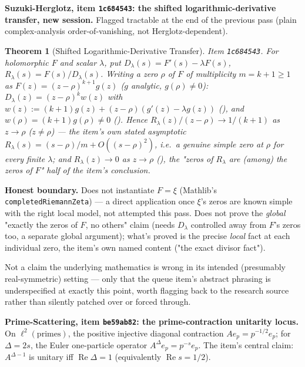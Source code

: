 \documentclass{report}
\newtheorem{theorem}{Theorem}[chapter]
\theoremstyle{definition}
\begin{document}
\textbf{Suzuki-Herglotz, item \texttt{1c684543}: the shifted logarithmic-derivative
transfer, new session.} Flagged tractable at the end of the previous pass (plain
complex-analysis order-of-vanishing, not Herglotz-dependent).

\begin{theorem}[Shifted Logarithmic-Derivative Transfer]
  \label{thm:shifted-log-deriv-transfer}
  \leanok
  Item \texttt{1c684543}. For holomorphic $F$ and scalar $\lambda$, put
  $D_\lambda(s)=F'(s)-\lambda F(s)$, $R_\lambda(s)=F(s)/D_\lambda(s)$. Writing a zero
  $\rho$ of $F$ of multiplicity $m=k+1\ge1$ as $F(z)=(z-\rho)^{k+1}g(z)$ ($g$ analytic,
  $g(\rho)\ne0$): $D_\lambda(z)=(z-\rho)^k w(z)$ with
  $w(z):=(k+1)g(z)+(z-\rho)(g'(z)-\lambda g(z))$
  (), and $w(\rho)=(k+1)g(\rho)\ne0$
  (). Hence
  $R_\lambda(z)/(z-\rho)\to1/(k+1)$ as $z\to\rho$ ($z\ne\rho$) --- the item's own stated
  asymptotic $R_\lambda(s)=(s-\rho)/m+O((s-\rho)^2)$, i.e.\ a genuine \emph{simple} zero at
  $\rho$ for every finite $\lambda$; and $R_\lambda(z)\to0$ as $z\to\rho$
  (), the "zeros of $R_\lambda$
  are (among) the zeros of $F$" half of the item's conclusion.
\end{theorem}

\textbf{Honest boundary.} Does not instantiate $F=\xi$ (Mathlib's
\texttt{completedRiemannZeta}) --- a direct application once $\xi$'s zeros are known
simple with the right local model, not attempted this pass. Does not prove the
\emph{global} "exactly the zeros of $F$, no others" claim (needs $D_\lambda$ controlled
away from $F$'s zeros too, a separate global argument); what's proved is the precise
\emph{local} fact at each individual zero, the item's own named content ("the exact
divisor fact").

Not a claim the underlying mathematics is wrong in its intended (presumably
real-symmetric) setting --- only that the queue item's abstract phrasing is
underspecified at exactly this point, worth flagging back to the research source rather
than silently patched over or forced through.

\textbf{Prime-Scattering, item \texttt{be59ab82}: the prime-contraction unitarity
locus.} On $\ell^2(\text{primes})$, the positive injective diagonal contraction
$Ae_p=p^{-1/2}e_p$; for $\Delta=2s$, the Euler one-particle operator $A^\Delta e_p=p^{-s}e_p$.
The item's central claim: $A^{\Delta-1}$ is unitary iff $\operatorname{Re}\Delta=1$
(equivalently $\operatorname{Re}s=1/2$).
\end{document}
